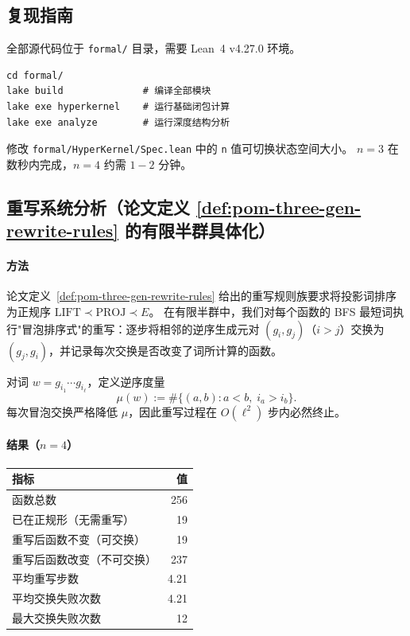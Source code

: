 \subsection{复现指南}

全部源代码位于 \texttt{formal/} 目录，需要 Lean~4 v4.27.0 环境。

\begin{verbatim}
cd formal/
lake build              # 编译全部模块
lake exe hyperkernel    # 运行基础闭包计算
lake exe analyze        # 运行深度结构分析
\end{verbatim}

\noindent
修改 \texttt{formal/HyperKernel/Spec.lean} 中的 \texttt{n} 值可切换状态空间大小。
$n=3$ 在数秒内完成，$n=4$ 约需 $1{-}2$ 分钟。

\subsection{重写系统分析（论文定义 \ref{def:pom-three-gen-rewrite-rules} 的有限半群具体化）}

\paragraph{方法}
论文定义~\ref{def:pom-three-gen-rewrite-rules} 给出的重写规则族要求将投影词排序为正规序 $\mathrm{LIFT}\prec\mathrm{PROJ}\prec E$。
在有限半群中，我们对每个函数的 BFS 最短词执行"冒泡排序式"的重写：逐步将相邻的逆序生成元对 $(g_i, g_j)$（$i>j$）交换为 $(g_j, g_i)$，并记录每次交换是否改变了词所计算的函数。

\begin{definition}\label{def:formal-inversion-measure}
对词 $w = g_{i_1}\cdots g_{i_\ell}$，定义逆序度量
$$
\mu(w) := \#\{(a,b) : a < b,\; i_a > i_b\}.
$$
每次冒泡交换严格降低 $\mu$，因此重写过程在 $O(\ell^2)$ 步内必然终止。
\end{definition}

\paragraph{结果（$n=4$）}

\begin{center}
\begin{tabular}{l|r}
\toprule
指标 & 值 \\
\midrule
函数总数 & 256 \\
已在正规形（无需重写）& 19 \\
重写后函数不变（可交换） & 19 \\
重写后函数改变（不可交换） & 237 \\
平均重写步数 & 4.21 \\
平均交换失败次数 & 4.21 \\
最大交换失败次数 & 12 \\
\bottomrule
\end{tabular}
\end{center}

